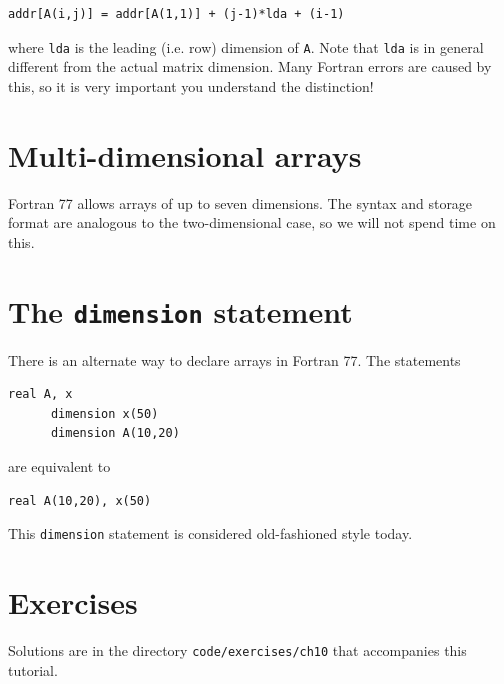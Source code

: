\begin{lstlisting}[style=fortran77]
      addr[A(i,j)] = addr[A(1,1)] + (j-1)*lda + (i-1)
\end{lstlisting}

where \texttt{lda} is the leading (i.e. row) dimension of \texttt{A}. Note that \texttt{lda} is in general different from the actual matrix dimension. Many Fortran errors are caused by this, so it is very important you understand the distinction!

\section{Multi-dimensional arrays}

Fortran 77 allows arrays of up to seven dimensions. The syntax and storage format are analogous to the two-dimensional case, so we will not spend time on this.

\section{The \texttt{dimension} statement}

There is an alternate way to declare arrays in Fortran 77. The statements

\begin{lstlisting}[style=fortran77]
      real A, x
      dimension x(50)
      dimension A(10,20)
\end{lstlisting}

are equivalent to

\begin{lstlisting}[style=fortran77]
      real A(10,20), x(50)
\end{lstlisting}

This \texttt{dimension} statement is considered old-fashioned style today.

\section{Exercises}

Solutions are in the directory \texttt{code/exercises/ch10} that accompanies this tutorial.

